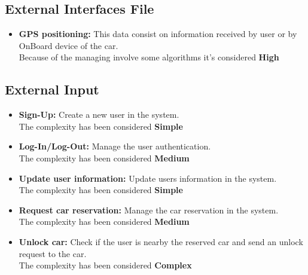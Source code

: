 \subsection{External Interfaces File} 

\begin{itemize}
	\item \textbf{GPS positioning:} This data consist on information received by user or by OnBoard device of the car. \\Because of the managing involve some algorithms it's considered \textbf{High}
\end{itemize}


\subsection{External Input} 
\begin{itemize}
	\item \textbf{Sign-Up:} Create a new user in the system. \\The complexity has been considered \textbf{Simple}
	\item \textbf{Log-In/Log-Out:} Manage the user authentication. \\The complexity has been considered \textbf{Medium}
	\item \textbf{Update user information:} Update users information in the system. \\The complexity has been considered \textbf{Simple}
	\item \textbf{Request car reservation:} Manage the car reservation in the system. \\The complexity has been considered \textbf{Medium}
	\item \textbf{Unlock car:} Check if the user is nearby the reserved car and send an unlock request to the car. \\The complexity has been considered \textbf{Complex}
\end{itemize}


